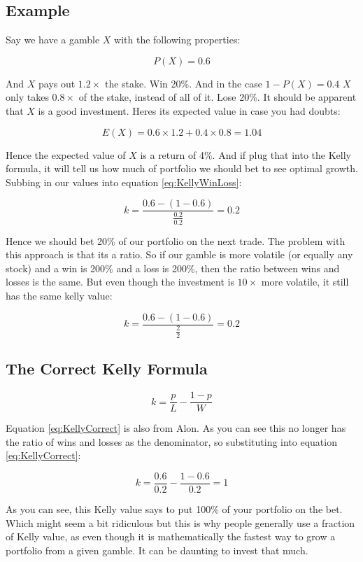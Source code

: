 \documentclass[12pt]{article}
\begin{document}
\subsection{Example}

    Say we have a gamble \(X\) with the following properties:

    \[P(X) = 0.6\]

    And \(X\) pays out \(1.2\times\) the stake. Win 20\%. And in the case \(1 - P(X) = 0.4\)
    \(X\) only takes \(0.8\times\) of the stake, instead of all of it. Lose 20\%. It should
    be apparent that \(X\) is a good investment. Heres its expected value in case you had
    doubts:

    \[E(X) = 0.6 \times 1.2 + 0.4 \times 0.8 = 1.04\]

    Hence the expected value of \(X\) is a return of 4\%. And if plug that into the Kelly
    formula, it will tell us how much of portfolio we should bet to see optimal growth.
    Subbing in our values into equation \ref{eq:KellyWinLoss}:

    \[k = \frac{0.6 - (1 - 0.6)}{\frac{0.2}{0.2}} = 0.2\]

    Hence we should bet 20\% of our portfolio on the next trade. The problem with this approach 
    is that its a ratio. So if our gamble is more volatile (or equally any stock) and a win is 
    200\% and a loss is 200\%, then the ratio between wins and losses is the same. But even
    though the investment is \(10\times\) more volatile, it still has the same kelly value:

    \[k = \frac{0.6 - (1 - 0.6)}{\frac{2}{2}} = 0.2\]

\subsection{The Correct Kelly Formula}

    \begin{equation}\label{eq:KellyCorrect}
        k = \frac{p}{L} - \frac{1 - p}{W}
    \end{equation}

    Equation \ref{eq:KellyCorrect} is also from Alon\cite{Alon}. As you can see this no longer 
    has the ratio of wins and losses as the denominator, so substituting into equation 
    \ref{eq:KellyCorrect}:

    \[k = \frac{0.6}{0.2} - \frac{1 - 0.6}{0.2} = 1\]

    As you can see, this Kelly value says to put 100\% of your portfolio on the bet. Which
    might seem a bit ridiculous but this is why people generally use a fraction of Kelly
    value, as even though it is mathematically the fastest way to grow a portfolio from a
    given gamble. It can be daunting to invest that much.
\end{document}
